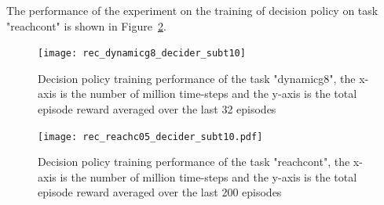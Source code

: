 The performance of the experiment on the training of decision policy on task "reachcont" is shown in Figure~\ref{fig:rec_reachc05_decider_subt10}.

\begin{figure}[!htbp]
\centering
\texttt{[image: rec\_dynamicg8\_decider\_subt10]}
\caption{Decision policy training performance of the task "dynamicg8", the x-axis is the number of million time-steps and the y-axis is the total episode reward averaged over the last 32 episodes}
\label{fig:rec_dynamicg8_decider_subt10}
\end{figure}


\begin{figure}
\centering
\texttt{[image: rec\_reachc05\_decider\_subt10.pdf]}
\caption{Decision policy training performance of the task "reachcont", the x-axis is the number of million time-steps and the y-axis is the total episode reward averaged over the last 200 episodes}
\label{fig:rec_reachc05_decider_subt10}
\end{figure}


